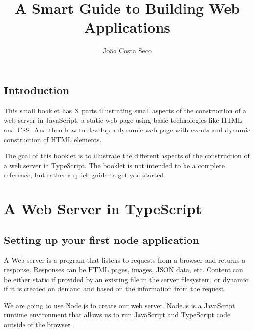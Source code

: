 \documentclass[12pt]{book}
\title{A Smart Guide to Building Web Applications}
\author{João Costa Seco}
\begin{document}
\maketitle

\chapter{Introduction}

This small booklet has X parts illustrating small aspects of the construction of
a web server in JavaScript, a static web page using basic technologies like HTML
and CSS. And then how to develop a dynamic web page with events and dynamic
construction of HTML elements. 

The goal of this booklet is to illustrate the different aspects of the
construction of a web server in TypeScript. The booklet is not intended to be a
complete reference, but rather a quick guide to get you started.

\part{A Web Server in TypeScript}

\chapter{Setting up your first node application}

A Web server is a program that listens to requests from a browser and returns a
response. Responses can be HTML pages, images, JSON data, etc. Content can be
either static if provided by an existing file in the server filesystem, or
dynamic if it is created on demand and based on the information from the request.

We are going to use Node.js to create our web server. Node.js is a JavaScript
runtime environment that allows us to run JavaScript and TypeScript code outside
of the browser.
\end{document}
